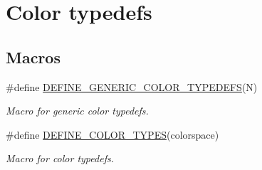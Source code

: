 \hypertarget{group___color_types}{\section{Color typedefs}
\label{group___color_types}
}
\subsection*{Macros}
\begin{DoxyCompactItemize}
\item 
\#define \hyperlink{group___color_types_ga83f7f072aef53405d76e922f4a2a84a5}{D\-E\-F\-I\-N\-E\-\_\-\-G\-E\-N\-E\-R\-I\-C\-\_\-\-C\-O\-L\-O\-R\-\_\-\-T\-Y\-P\-E\-D\-E\-F\-S}(N)
\begin{DoxyCompactList}\small\item\em Macro for generic color typedefs. \end{DoxyCompactList}\item 
\#define \hyperlink{group___color_types_ga51fca00f14d0e12f57b41d7387fc678c}{D\-E\-F\-I\-N\-E\-\_\-\-C\-O\-L\-O\-R\-\_\-\-T\-Y\-P\-E\-S}(colorspace)
\begin{DoxyCompactList}\small\item\em Macro for color typedefs. \end{DoxyCompactList}\end{DoxyCompactItemize}
